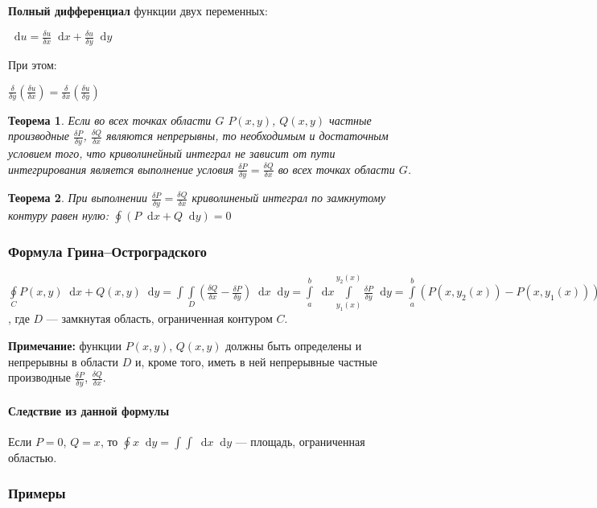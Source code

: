 \documentclass{article}
\newcommand*\diff{\mathop{}\!\mathrm{d}}
\newtheorem{theorem}{Теорема}
\begin{document}
\textbf{Полный дифференциал} функции двух переменных:

$\diff u = \frac{\delta u}{\delta x} \diff x + \frac{\delta u}{\delta y} \diff y$

При этом:

$\frac{\delta}{\delta y} (\frac{\delta u}{\delta x}) = \frac{\delta}{\delta x} (\frac{\delta u}{\delta y})$

\begin{theorem}
    Если во всех точках области $G$ $P(x, y)$, $Q(x, y)$ частные производные $\frac{\delta P}{\delta y}$, $\frac{\delta Q}{\delta x}$ являются непрерывны, то необходимым и достаточным условием того, что криволинейный интеграл не зависит от пути интегрирования является выполнение условия $\frac{\delta P}{\delta y} = \frac{\delta Q}{\delta x}$ во всех точках области $G$.
\end{theorem}

\begin{theorem}
    При выполнении $\frac{\delta P}{\delta y} = \frac{\delta Q}{\delta x}$ криволиненый интеграл по замкнутому контуру равен нулю: $\oint (P \diff x + Q \diff y) = 0$
\end{theorem}

\subsubsection{Формула Грина–Остроградского}

$\oint\limits_{C} P(x, y) \diff x + Q(x, y) \diff y = \int\int\limits_{D} (\frac{\delta Q}{\delta x} - \frac{\delta P}{\delta y}) \diff x \diff y = \int\limits_{a}^{b} \diff x \int\limits_{y_1(x)}^{y_2(x)} \frac{\delta P}{\delta y} \diff y = \int\limits_{a}^{b} (P(x, y_2(x)) - P(x, y_1(x))) \diff x$, где $D$ — замкнутая область, ограниченная контуром $C$.

\textbf{Примечание:} функции $P(x, y)$, $Q(x, y)$ должны быть определены и непрерывны в области $D$ и, кроме того, иметь в ней непрерывные частные производные $\frac{\delta P}{\delta y}$, $\frac{\delta Q}{\delta x}$.

\paragraph{Следствие из данной формулы} Если $P = 0$, $Q = x$, то $\oint x \diff y = \int\int \diff x \diff y$ — площадь, ограниченная областью.

\subsubsection{Примеры}
\end{document}
